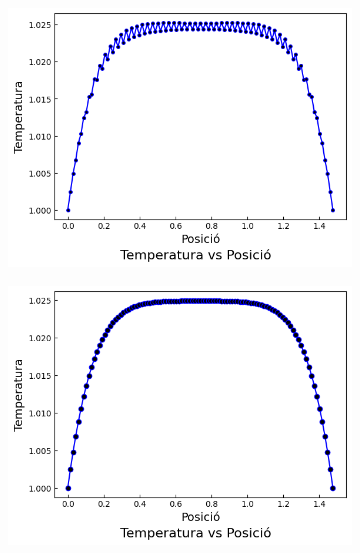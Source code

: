 \documentclass{article}
\begin{document}
\begin{figure}[h]
    \centering
    \begin{subfigure}[b]{0.32\textwidth}
        \includegraphics[width=\textwidth]{images/T_vs_z_at1.png} 
        \caption{}
        \label{fig:euler_exp_at1}
    \end{subfigure}
    \hfill
    \begin{subfigure}[b]{0.32\textwidth}
        \includegraphics[width=\textwidth]{images/T_vs_z_at2.png}
        \caption{} 
        \label{fig:euler_exp_at2}
    \end{subfigure}
    \hfill
    \begin{subfigure}[b]{0.32\textwidth}

\end{subfigure}
\end{figure}
\end{document}
